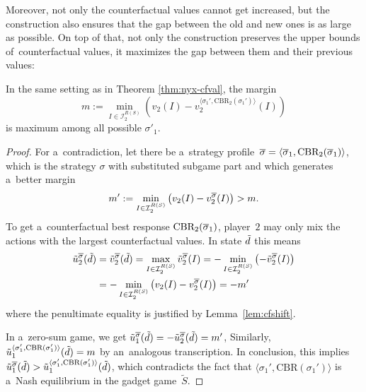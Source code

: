 \begin{cor}
  \label{cor:sm-max-margin-gadget}
  \todo
\end{cor}

\todo
Moreover, not only the counterfactual values cannot get increased, but the construction also ensures that the gap between the old and new ones is as large as possible.
On top of that, not only the construction preserves the upper bounds of~counterfactual values, it maximizes the gap between them and their previous values:

\begin{thm}
  \label{thm:sm-maximized}
  In the same setting as in Theorem \ref{thm:nyx-cfval}, the margin
  \[
    m := \min _{I \in \mathcal{I}_2^{R(S)}} 
    \left( v_2(I) - v_2^{\langle\sigma_1', \textrm{CBR}_2 (\sigma_1')\rangle}(I) \right)
  \]
  is maximum among all possible $\sigma'_1$.
\end{thm}
\begin{proof}
  For a~contradiction, let there be a~strategy profile~${\overline{\sigma}} = \langle {\overline{\sigma}}_1, \textrm{CBR}_2 ({\overline{\sigma}}_1)\rangle$, which is the strategy $\sigma$ with substituted subgame part and which generates a~better margin
  \[
    m' := \min _{I \in \mathcal{I}_2^{R(S)}} 
    \left( v_2(I) - v_2^{{\overline{\sigma}}}(I) \right)
    > m.
  \]
  To get a~counterfactual best response $\textrm{CBR}_2 ({\overline{\sigma}}_1)$, player~$2$ may only mix the actions with the largest counterfactual values.
  In state $\tilde{d}$ this means
  \begin{equation*}
    \begin{split}
      \tilde{u}_2 ^{\overline{\sigma}}(\tilde{d})
      &= \tilde{v}_2 ^{\overline{\sigma}}(\tilde{d})
      = \max _{I \in \mathcal{I}_2^{R(S)}} \tilde{v}_2 ^{\overline{\sigma}}(I)
      = - \min _{I \in \mathcal{I}_2^{R(S)}} \left( -\tilde{v}_2 ^{\overline{\sigma}}(I) \right) \\
      &= - \min _{I \in \mathcal{I}_2^{R(S)}} \left( v_2(I) - v_2^{{\overline{\sigma}}}(I) \right)
      = - m'
    \end{split}
  \end{equation*}
  where the penultimate equality is justified by Lemma~\ref{lem:cfshift}.

  In a~zero-sum game, we get
  $
  \tilde{u}_1 ^{\overline{\sigma}}(\tilde{d})
  = -\tilde{u}_2 ^{\overline{\sigma}}(\tilde{d})
  = m'
  $,
  Similarly,
  $
  \tilde{u}_1 ^{\langle\sigma_1', \textrm{CBR}(\sigma_1')\rangle} (\tilde{d})
  = m
  $
  by an~analogous transcription.
  In conclusion, this implies
  $
  \tilde{u}_1 ^{\overline{\sigma}}(\tilde{d})
  > \tilde{u}_1 ^{\langle\sigma_1', \textrm{CBR}(\sigma_1')\rangle} (\tilde{d})
  $,
  which contradicts the fact that $\langle\sigma_1', \textrm{CBR}(\sigma_1')\rangle$ is a~Nash equilibrium in the gadget game~$\tilde{S}$.
\end{proof}

